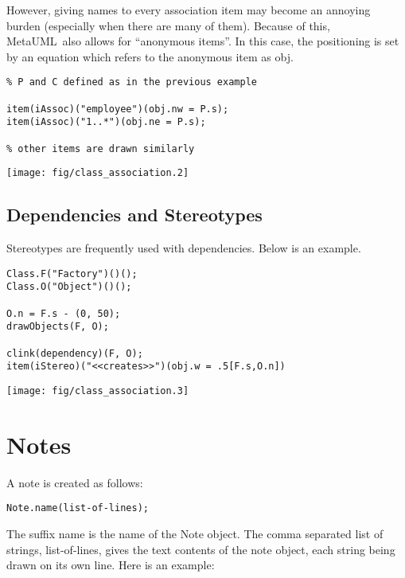 \documentclass{article}
\newcommand{\code}{\ttfamily}
\newcommand{\metauml}{MetaUML}
\begin{document}
However, giving names to every association item may become an annoying burden
(especially when there are many of them). Because of this, \metauml\ also allows for
``anonymous items''. In this case, the positioning is set by an equation
which refers to the anonymous item as {\code obj}.

\begin{multicols}{2}
\begin{verbatim}
% P and C defined as in the previous example

item(iAssoc)("employee")(obj.nw = P.s);
item(iAssoc)("1..*")(obj.ne = P.s);

% other items are drawn similarly
\end{verbatim}
\columnbreak
\hspace{3cm}\texttt{[image: fig/class\_association.2]}
\end{multicols}

\subsection{Dependencies and Stereotypes}

Stereotypes are frequently used with dependencies. Below is an example.
\pagebreak

\begin{multicols}{2}
\begin{verbatim}
Class.F("Factory")()();
Class.O("Object")()();

O.n = F.s - (0, 50);
drawObjects(F, O);

clink(dependency)(F, O);
item(iStereo)("<<creates>>")(obj.w = .5[F.s,O.n])
\end{verbatim}
\columnbreak
\hspace{3cm}\texttt{[image: fig/class\_association.3]}
\end{multicols}

\section{Notes}

A note is created as follows:

\begin{verbatim}
Note.name(list-of-lines);
\end{verbatim}

The suffix {\code name} is the name of the {\code Note} object. The comma separated list of strings, {\code list-of-lines}, gives the text contents of the note object, each string being drawn on its own line.
Here is an example:
\end{document}

